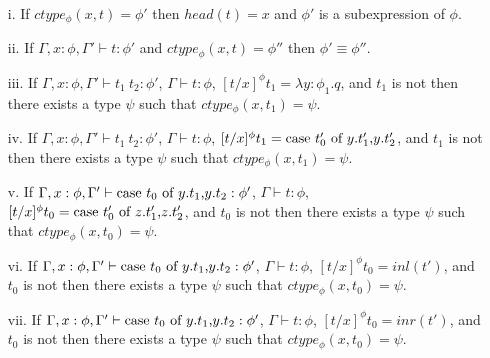 \begin{lemma}
  \label{lemma:ctype_props_ssfp}
  \small
  \begin{itemize}
  \item[i.] If $ctype_\phi(x,t) = \phi'$ then $head(t) = x$ and $\phi'$ 
    is a subexpression of $\phi$.
    
  \item[ii.] If $\Gamma,x:\phi,\Gamma' \vdash t:\phi'$ and $ctype_\phi(x,t) = \phi''$ then
    $\phi' \equiv \phi''$.

  \item[iii.] If $\Gamma,x:\phi,\Gamma' \vdash t_1\ t_2:\phi'$, $\Gamma \vdash t:\phi$,
    $[t/x]^\phi t_1 = \lambda y:\phi_1.q$, and $t_1$ is not then there exists a type
    $\psi$ such that $ctype_\phi(x,t_1) = \psi$.

  \item[iv.] If $\Gamma,x:\phi,\Gamma' \vdash t_1\ t_2:\phi'$, $\Gamma \vdash t:\phi$,
    $[t/x]^\phi t_1 = \mbox{case}\ t'_0\ \text{of}\ y\text{.}t'_1\text{,}y\text{.}t'_2$, and $t_1$ is not then there exists a type
    $\psi$ such that $ctype_\phi(x,t_1) = \psi$.

  \item[v.] If $\Gamma,x:\phi,\Gamma' \vdash \mbox{case}\ t_0\ \text{of}\ y\text{.}t_1\text{,}y\text{.}t_2:\phi'$, 
    $\Gamma \vdash t:\phi$, $[t/x]^\phi t_0 = \mbox{case}\ t'_0\ \text{of}\ z\text{.}t'_1\text{,}z\text{.}t'_2$, and 
    $t_0$ is not then there exists a type $\psi$ such that $ctype_\phi(x,t_0) = \psi$.

  \item[vi.] If $\Gamma,x:\phi,\Gamma' \vdash \mbox{case}\ t_0\ \text{of}\ y\text{.}t_1\text{,}y\text{.}t_2:\phi'$, 
    $\Gamma \vdash t:\phi$, $[t/x]^\phi t_0 = inl(t')$, and $t_0$ is not then there 
    exists a type $\psi$ such that $ctype_\phi(x,t_0) = \psi$.

  \item[vii.] If $\Gamma,x:\phi,\Gamma' \vdash \mbox{case}\ t_0\ \text{of}\ y\text{.}t_1\text{,}y\text{.}t_2:\phi'$, 
    $\Gamma \vdash t:\phi$, $[t/x]^\phi t_0 = inr(t')$, and $t_0$ is not then 
    there exists a type $\psi$ such that $ctype_\phi(x,t_0) = \psi$.
  \end{itemize}
\end{lemma}
